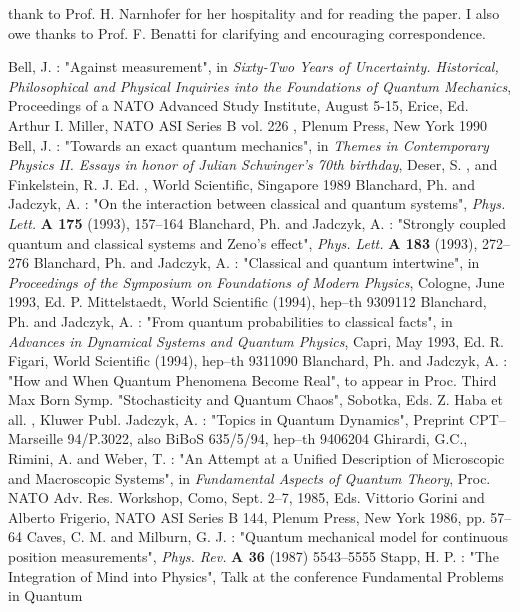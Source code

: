 \documentclass[12pt]{article}
\begin{document}
thank to Prof. H. Narnhofer for her hospitality and for reading the paper.
I also owe thanks to Prof. F. Benatti for clarifying and encouraging
correspondence.
\begin{thebibliography}{99}
 Bell, J. : "Against measurement", in {\sl Sixty-Two Years
of Uncertainty. Historical, Philosophical and Physical Inquiries into the
Foundations of Quantum Mechanics}, Proceedings of a NATO Advanced Study
Institute, August 5-15, Erice, Ed. Arthur I. Miller, NATO ASI Series B vol.
226 , Plenum Press, New York 1990
 Bell,  J. : "Towards an exact quantum mechanics",  in
{\sl Themes in Contemporary Physics II.  Essays in honor of Julian
Schwinger's 70th birthday},  Deser,  S. ,  and Finkelstein,  R. J.  Ed. ,
World Scientific,  Singapore 1989
 Blanchard, Ph. and Jadczyk, A. : "On the interaction
between classical and quantum systems", {\sl Phys. Lett. }{\bf A 175}
(1993), 157--164
 Blanchard, Ph. and Jadczyk, A. : "Strongly coupled
quantum and classical systems and Zeno's effect", {\sl Phys. Lett. }{\bf A
183} (1993), 272--276
 Blanchard,  Ph.  and Jadczyk,  A. : "Classical and quantum
intertwine",  in {\sl Proceedings of the Symposium on Foundations of
Modern Physics},  Cologne,  June 1993,  Ed.  P.  Mittelstaedt,  World
Scientific  (1994), hep--th 9309112
 Blanchard,  Ph.  and Jadczyk,  A. : "From quantum
probabilities to classical facts",  in {\sl Advances in Dynamical
Systems and Quantum Physics},  Capri,  May 1993,  Ed.  R.  Figari,  World
Scientific  (1994), hep--th 9311090
 Blanchard,  Ph.  and Jadczyk,  A. :  "How and
When Quantum Phenomena Become Real",  to appear in Proc.
Third Max Born Symp.  "Stochasticity and Quantum Chaos",
Sobotka,  Eds.  Z.  Haba et all. ,  Kluwer Publ.
 Jadczyk, A. : "Topics in Quantum Dynamics", Preprint CPT--
Marseille 94/P.3022, also BiBoS 635/5/94, hep--th 9406204
 Ghirardi, G.C., Rimini, A. and Weber, T. : "An Attempt at
a Unified Description of Microscopic and Macroscopic Systems", in {\sl
Fundamental Aspects of Quantum Theory}, Proc. NATO Adv. Res. Workshop,
Como, Sept. 2--7, 1985, Eds. Vittorio Gorini and Alberto Frigerio, NATO ASI
Series B 144, Plenum Press, New York 1986, pp. 57--64
 Caves, C. M. and Milburn, G. J. : "Quantum mechanical
model for continuous position measurements", {\sl Phys. Rev.} {\bf A 36}
(1987) 5543--5555
 Stapp, H. P. : "The Integration of Mind into
Physics", Talk at the conference Fundamental Problems in Quantum

\end{thebibliography}
\end{document}

